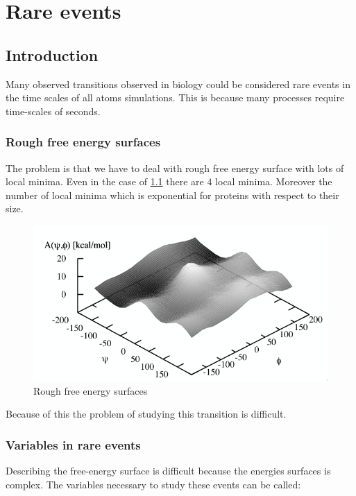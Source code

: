 \graphicspath{{chapters/19/images/}}
\chapter{Rare events}

\section{Introduction}
Many observed transitions observed in biology could be considered rare events in the time scales of all atoms simulations.
This is because many processes require time-scales of seconds.

	\subsection{Rough free energy surfaces}
	The problem is that we have to deal with rough free energy surface with lots of local minima.
	Even in the case of \ref{fig:rough-free-energy-surfaces} there are $4$ local minima.
	Moreover the number of local minima which is exponential for proteins with respect to their size.

	\begin{figure}[H]
		\includegraphics[width=\textwidth]{rough-free-energy-surfaces}
		\caption{Rough free energy surfaces}
		\label{fig:rough-free-energy-surfaces}
	\end{figure}

	Because of this the problem of studying this transition is difficult.

	\subsection{Variables in rare events}
	Describing the free-energy surface is difficult because the energies surfaces is complex.
	The variables necessary to study these events can be called:


